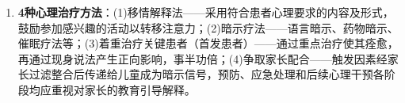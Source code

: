 \begin{enumerate}[leftmargin=*, itemsep=5pt]
    \item \textbf{4种心理治疗方法}：(1)移情解释法——采用符合患者心理要求的内容及形式，鼓励参加感兴趣的活动以转移注意力；(2)暗示疗法——语言暗示、药物暗示、催眠疗法等；(3)着重治疗关键患者（首发患者）——通过重点治疗使其痊愈，再通过现身说法产生正向影响，事半功倍；(4)争取家长配合——触发因素经家长过滤整合后传递给儿童成为暗示信号，预防、应急处理和后续心理干预各阶段均应重视对家长的教育引导解释。
\end{enumerate}

\newpage

